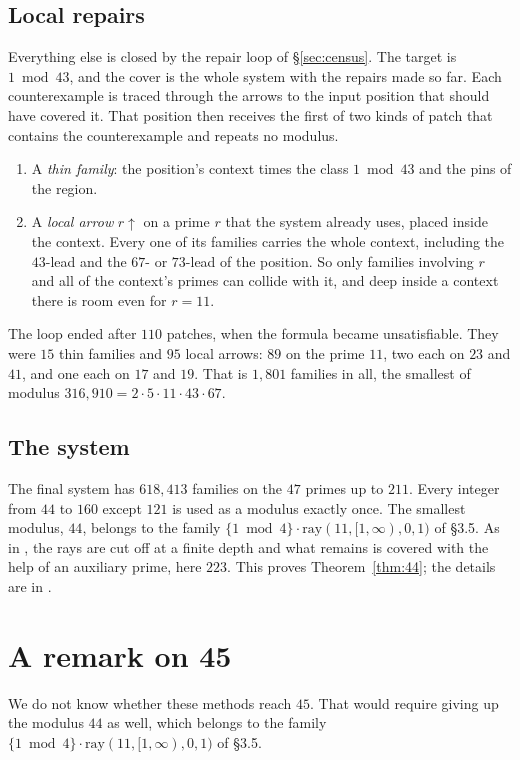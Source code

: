 \documentclass[11pt]{amsart}
\theoremstyle{definition}
\theoremstyle{remark}
\newcommand{\up}{{\uparrow}}
\newcommand{\ray}{\mathrm{ray}}
\begin{document}
\subsection*{Local repairs}
Everything else is closed by the repair loop of §\ref{sec:census}. The target is $1 \bmod 43$, and the cover is the
whole system with the repairs made so far. Each counterexample is traced through the arrows to the input position
that should have covered it. That position then receives the first of two kinds of patch that contains the
counterexample and repeats no modulus.
\begin{enumerate}
\item A \emph{thin family}: the position's context times the class $1 \bmod 43$ and the pins of the region.
\item A \emph{local arrow} $r\up$ on a prime $r$ that the system already uses, placed inside the context. Every one
  of its families carries the whole context, including the $43$-lead and the $67$- or $73$-lead of the position. So
  only families involving $r$ and all of the context's primes can collide with it, and deep inside a context there
  is room even for $r=11$.
\end{enumerate}
The loop ended after $110$ patches, when the formula became unsatisfiable. They were $15$ thin families and $95$ local
arrows: $89$ on the prime $11$, two each on $23$ and $41$, and one each on $17$ and $19$. That is $1{,}801$ families
in all, the smallest of modulus $316{,}910=2\cdot5\cdot11\cdot43\cdot67$.

\subsection*{The system}
The final system has $618{,}413$ families on the $47$ primes up to $211$. Every integer from $44$ to $160$ except $121$
is used as a modulus exactly once. The smallest modulus, $44$, belongs to the family
$\{1 \bmod 4\}\cdot\ray(11,[1,\infty),0,1)$ of §3.5. As in \cite{Nielsen09}, the rays are cut off at a finite depth
and what remains is covered with the help of an auxiliary prime, here $223$. This proves Theorem~\ref{thm:44}; the
details are in \cite{Companion}.

\section{A remark on 45}\label{sec:45}

We do not know whether these methods reach $45$. That would require giving up the modulus $44$ as well, which
belongs to the family $\{1 \bmod 4\}\cdot\ray(11,[1,\infty),0,1)$ of §3.5.
\end{document}
